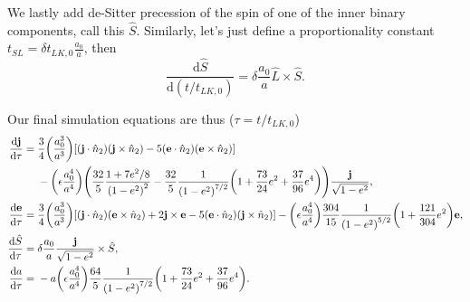 \documentclass[11pt,
        usenames, %
        dvipsnames %
    ]{article}
\newcommand*{\rd}[2]{\frac{\mathrm{d}#1}{\mathrm{d}#2}}
\newcommand*{\bm}[1]{\boldsymbol{\mathbf{#1}}}
\DeclarePairedDelimiter\p{\lparen}{\rparen}
\DeclarePairedDelimiter\s{\lbrack}{\rbrack}
\begin{document}
We lastly add de-Sitter precession of the spin of one of the inner binary
components, call this $\hat{S}$. Similarly, let's just define a proportionality
constant $t_{SL} = \delta t_{LK, 0}\frac{a_0}{a}$, then
\begin{equation}
    \rd{\hat{S}}{(t / t_{LK, 0})} = \delta \frac{a_0}{a} \hat{L} \times \hat{S}.
\end{equation}

Our final simulation equations are thus ($\tau = t / t_{LK, 0}$)
\begin{align}
    \rd{\bm{j}}{\tau} ={}& \frac{3}{4}\p*{\frac{a_0^3}{a^3}} \s*{
        \p*{\bm{j} \cdot \hat{n}_2} \p*{\bm{j} \times \hat{n}_2}
        - 5\p*{\bm{e} \cdot \hat{n}_2}\p*{\bm{e} \times \hat{n}_2}
        }\nonumber\\
        &- \p*{\epsilon \frac{a_0^4}{a^4}}\p*{
            \frac{32}{5}
                \frac{1 + 7e^2/8}{\p*{1 - e^2}^2}
            - \frac{32}{5} \frac{1}{\p*{1 - e^2}^{7/2}}\p*{1 + \frac{73}{24}e^2
                    + \frac{37}{96}e^4}
            }\frac{\bm{j}}{\sqrt{1 - e^{2}}},\\
    \rd{\bm{e}}{\tau} ={}&
        \frac{3}{4}\p*{\frac{a_0^3}{a^3}} \s*{
            \p*{\bm{j} \cdot \hat{n}_2} \p*{\bm{e} \times \hat{n}_2}
            + 2\bm{j} \times \bm{e}
            - 5\p*{\bm{e} \cdot \hat{n}_2}\p*{\bm{j} \times \hat{n}_2}
            }
        -
            \p*{\epsilon\frac{a_0^4}{a^4}}
            \frac{304}{15}
            \frac{1}{\p*{1 - e^2}^{5/2}}
            \p*{1 + \frac{121}{304} e^2}\bm{e},\\
    \rd{\hat{S}}{\tau} ={}& \delta \frac{a_0}{a}
        \frac{\bm{j}}{\sqrt{1 - e^2}} \times \hat{S},\\
    \rd{a}{\tau} ={}& -a\p*{\epsilon\frac{a_0^4}{a^4}}
        \frac{64}{5} \frac{1}{\p*{1 - e^2}^{7/2}}\p*{1 + \frac{73}{24}e^2
            + \frac{37}{96}e^4}.
\end{align}
\end{document}

